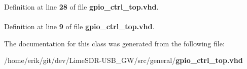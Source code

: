 Definition at line {\bf 28} of file {\bf gpio\+\_\+ctrl\+\_\+top.\+vhd}.

\paragraph[{std\+\_\+logic\+\_\+1164}]{\hspace{0.3cm}{\ttfamily [Package]}}\label{classgpio__ctrl__top_acd03516902501cd1c7296a98e22c6fcb}


Definition at line {\bf 9} of file {\bf gpio\+\_\+ctrl\+\_\+top.\+vhd}.



The documentation for this class was generated from the following file\+:\begin{DoxyCompactItemize}
\item 
/home/erik/git/dev/\+Lime\+S\+D\+R-\/\+U\+S\+B\+\_\+\+G\+W/src/general/{\bf gpio\+\_\+ctrl\+\_\+top.\+vhd}\end{DoxyCompactItemize}
